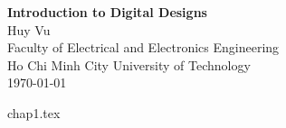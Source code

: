 \documentclass[12pt, a4paper]{article}
\begin{document}
\begin{titlepage}
    \centering
    \vspace*{1in}

    {\LARGE \bfseries Introduction to Digital Designs}\\[1.5cm]

    {\large Huy Vu}\\[0.5cm]
    {\large Faculty of Electrical and Electronics Engineering}\\
    {\large Ho Chi Minh City University of Technology}\\[2cm]

    {\large \today}

    \vfill
\end{titlepage}
\tableofcontents
\newpage
{chap1.tex}
\end{document}
